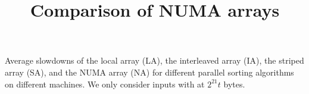 \documentclass{article}
\title{Comparison of NUMA arrays}
\begin{document}
\maketitle

\comppaspas

\begin{table}
  \resizebox{\textwidth}{!}{%

}
  \caption{
    Average slowdowns of the local array (LA), the interleaved array
    (IA), the striped array (SA), and the NUMA array (NA) for
    different parallel sorting algorithms on different machines. We
    only consider inputs with at $2^{21}t$ bytes.}
\end{table}
\end{document}
